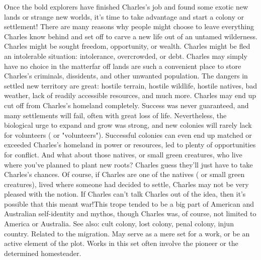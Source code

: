 \documentclass[12pt]{book}
\begin{document}
Once the bold explorers have finished Charles's job and found some exotic new lands or strange new worlds, it's time to take advantage and start a colony or settlement! There are many reasons why people might choose to leave everything Charles know behind and set off to carve a new life out of an untamed wilderness. Charles might be sought freedom, opportunity, or wealth. Charles might be fled an intolerable situation: intolerance, overcrowded, or debt. Charles may simply have no choice in the matterfar off lands are such a convenient place to store Charles's criminals, dissidents, and other unwanted population. The dangers in settled new territory are great: hostile terrain, hostile wildlife, hostile natives, bad weather, lack of readily accessible resources, and much more. Charles may end up cut off from Charles's homeland completely. Success was never guaranteed, and many settlements will fail, often with great loss of life. Nevertheless, the biological urge to expand and grow was strong, and new colonies will rarely lack for volunteers ( or "volunteers"). Successful colonies can even end up matched or exceeded Charles's homeland in power or resources, led to plenty of opportunities for conflict. And what about those natives, or small green creatures, who live where you've planned to plant new roots? Charles guess they'll just have to take Charles's chances. Of course, if Charles are one of the natives ( or small green creatures), lived where someone had decided to settle, Charles may not be very pleased with the notion. If Charles can't talk Charles out of the idea, then it's possible that this meant war!This trope tended to be a big part of American and Australian self-identity and mythos, though Charles was, of course, not limited to America or Australia. See also: cult colony, lost colony, penal colony, injun country. Related to the migration. May serve as a mere set for a work, or be an active element of the plot. Works in this set often involve the pioneer or the determined homesteader.
\end{document}
